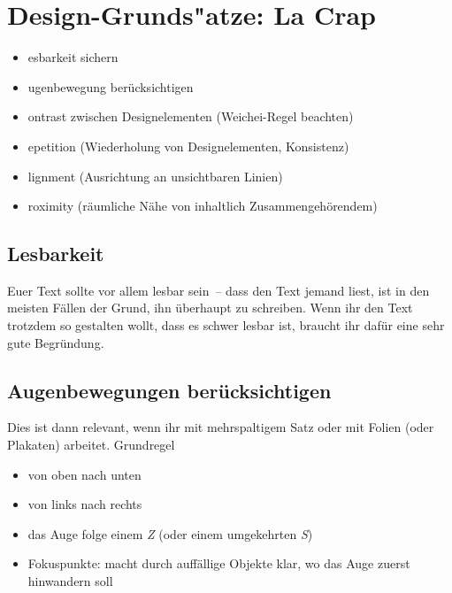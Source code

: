 \section{Design-Grunds"atze: La Crap}

\begin{itemize}
\item {}esbarkeit sichern
\item {}ugenbewegung berücksichtigen

\smallskip
\item {}ontrast zwischen Designelementen (Weichei-Regel beachten)
\item {}epetition (Wiederholung von Designelementen, Konsistenz)
\item {}lignment (Ausrichtung an unsichtbaren Linien)
\item {}roximity (räumliche Nähe von inhaltlich Zusammengehörendem)
\end{itemize}

\subsection{Lesbarkeit}
Euer Text sollte vor allem lesbar sein~-- dass den Text jemand liest, ist in den meisten Fällen der Grund, ihn überhaupt zu schreiben. Wenn ihr den Text trotzdem so gestalten wollt, dass es schwer lesbar ist, braucht ihr dafür eine sehr gute Begründung.

\subsection{Augenbewegungen berücksichtigen}
Dies ist dann relevant, wenn ihr mit mehrspaltigem Satz oder mit Folien (oder Plakaten) arbeitet. Grundregel
\begin{itemize}
  \item von oben nach unten
  \item von links nach rechts
  \item das Auge folge einem \emph{Z} (oder einem umgekehrten \emph{S})
  \item Fokuspunkte: macht durch auffällige Objekte klar, wo das Auge zuerst hinwandern soll
\end{itemize}

